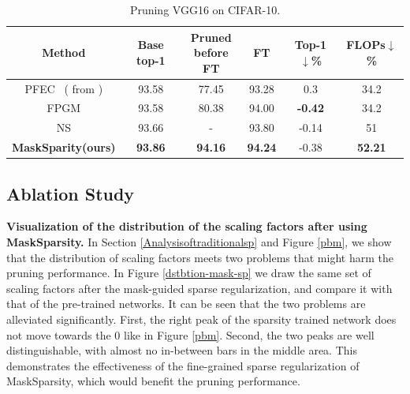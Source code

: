 \documentclass[review]{cvpr}
\begin{document}
\begin{table}[ht]
	\caption{Pruning VGG16 on CIFAR-10.}
	\vspace{+0.2em}
	\footnotesize
	\setlength{\tabcolsep}{0.1em}
	\begin{center}
		\begin{tabular}{cccccc}
			\hline
			
		Method 			&Base top-1		&\shortstack {Pruned\\before FT} &FT	& Top-1 $\downarrow$\% 	&FLOPs$\downarrow$\% \\ 
		\hline
		
		PFEC~\cite{li2016pruning} {\scriptsize{( from \cite{FPGM})}}   & 93.58  &77.45 & 93.28 & 0.3  &34.2\\  
		
		FPGM \cite{FPGM}   & 93.58  &80.38 & 94.00  &\textbf{-0.42} &34.2\\  
		
		NS \cite{liu2017learning} & 93.66 &-  & 93.80  &-0.14 &51\\  
		
    	\textbf{MaskSparity(ours)}                &\textbf{93.86}   &\textbf{94.16} &\textbf{94.24} &-0.38 & \textbf{52.21}\\ 
			
		
		    
			\hline
		
		\end{tabular}
	\end{center}
	\label{exp-table-cifar10-VGG16}
\end{table}








\subsection{Ablation Study}\label{abalation}
\textbf{Visualization of the distribution of the scaling factors after using MaskSparsity.} 
In Section \ref{Analysisoftraditionalsp} and Figure \ref{pbm}, we show that the distribution of scaling factors meets two problems that might harm the pruning performance. In Figure \ref{dstbtion-mask-sp} we draw the same set of scaling factors after the mask-guided sparse regularization, and compare it with that of the pre-trained networks. It can be seen that the two problems are alleviated significantly. First, the right peak of the sparsity trained network does not move towards the 0 like in Figure \ref{pbm}. Second, the two peaks are well distinguishable, with almost no in-between bars in the middle area. This demonstrates the effectiveness of the fine-grained sparse regularization of MaskSparsity, which would benefit the pruning performance.
  
\end{document}

